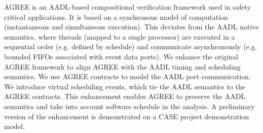 AGREE is an AADL-based compositional verification framework used in safety critical applications. It is based on a synchronous model of computation (instantaneous and simultaneous execution). This deviates from the AADL native semantics, where threads (mapped to a single processor) are executed in a sequential order (e.g. defined by schedule) and communicate asynchronously (e.g. bounded FIFOs associated with event data ports). We enhance the original AGREE framework to align AGREE with the AADL timing and scheduling semantics. We use AGREE contracts to model the AADL port communication. We introduce virtual scheduling events, which tie the AADL semantics to the AGREE contracts. This enhancement enables AGREE to preserve the AADL semantics and take into account software schedule in the analysis. A preliminary version of the enhancement is demonstrated on a CASE project demonstration model.
